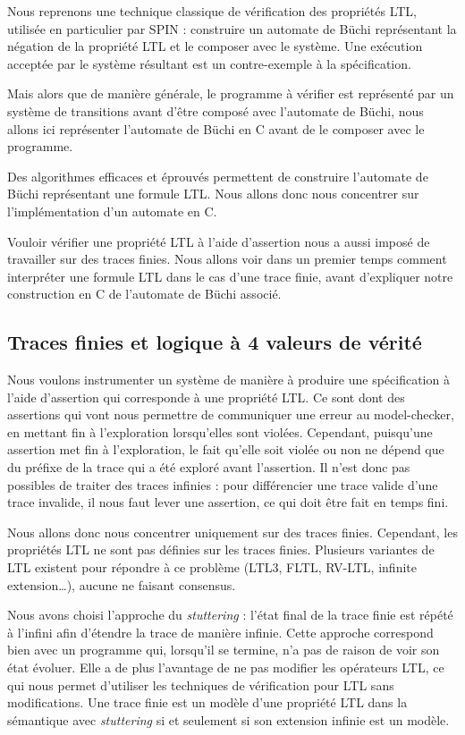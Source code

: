 Nous reprenons une technique classique de vérification des propriétés
LTL, utilisée en particulier par SPIN : construire un automate de Büchi
représentant la négation de la propriété LTL et le composer avec le
système. Une exécution acceptée par le système résultant est un
contre-exemple à la spécification.

Mais alors que de manière générale, le programme à vérifier est
représenté par un système de transitions avant d'être composé avec
l'automate de Büchi, nous allons ici représenter l'automate de Büchi en
C avant de le composer avec le programme.

Des algorithmes efficaces et éprouvés permettent de construire
l'automate de Büchi représentant une formule LTL\cite{ltl2ba}. Nous
allons donc nous concentrer sur l'implémentation d'un automate en C.

Vouloir vérifier une propriété LTL à l'aide d'assertion nous a aussi
imposé de travailler sur des traces finies. Nous allons voir dans un
premier temps comment interpréter une formule LTL dans le cas d'une
trace finie, avant d'expliquer notre construction en C de l'automate de
Büchi associé.

\subsection{Traces finies et logique à 4 valeurs de vérité}

Nous voulons instrumenter un système de manière à produire une
spécification à l'aide d'assertion qui corresponde à une propriété LTL.
Ce sont dont des assertions qui vont nous permettre de communiquer une
erreur au model-checker, en mettant fin à l'exploration lorsqu'elles
sont violées. Cependant, puisqu'une assertion met fin à l'exploration,
le fait qu'elle soit violée ou non ne dépend que du préfixe de la trace
qui a été exploré avant l'assertion. Il n'est donc pas possibles de
traiter des traces infinies : pour différencier une trace valide d'une
trace invalide, il nous faut lever une assertion, ce qui doit être fait
en temps fini.

Nous allons donc nous concentrer uniquement sur des traces finies.
Cependant, les propriétés LTL ne sont pas définies sur les traces
finies. Plusieurs variantes de LTL existent pour répondre à ce problème
(LTL3, FLTL, RV-LTL, infinite extension\ldots{}), aucune ne faisant
consensus.

Nous avons choisi l'approche du \emph{stuttering} : l'état final de la
trace finie est répété à l'infini afin d'étendre la trace de manière
infinie. Cette approche correspond bien avec un programme qui, lorsqu'il
se termine, n'a pas de raison de voir son état évoluer. Elle a de plus
l'avantage de ne pas modifier les opérateurs LTL, ce qui nous permet
d'utiliser les techniques de vérification pour LTL sans modifications.
Une trace finie est un modèle d'une propriété LTL dans la sémantique
avec \emph{stuttering} si et seulement si son extension infinie est un
modèle.


